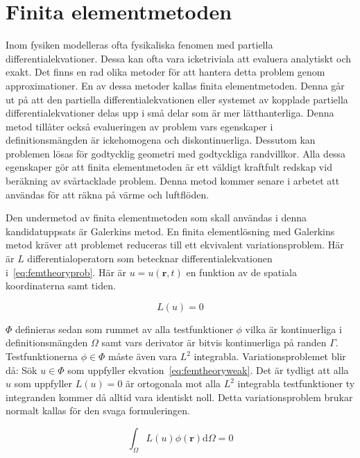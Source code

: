 \section{Finita elementmetoden}

Inom fysiken modelleras ofta fysikaliska fenomen med partiella differentialekvationer.
Dessa kan ofta vara icketriviala att evaluera analytiskt och exakt. Det finns en
rad olika metoder för att hantera detta problem genom approximationer. En av
dessa metoder kallas finita elementmetoden. Denna går ut på att den
partiella differentialekvationen eller systemet av kopplade partiella
differentialekvationer delas upp i små delar som är mer lätthanterliga.
Denna metod tillåter också evalueringen av problem vars egenskaper i
definitionsmängden är ickehomogena och diskontinuerliga. Dessutom kan
problemen lösas för godtycklig geometri med godtyckliga randvillkor. Alla
dessa egenskaper gör att finita elementmetoden är ett väldigt kraftfult redskap
vid beräkning av svårtacklade problem. Denna metod kommer senare i arbetet
att användas för att räkna på värme och luftflöden.

Den undermetod av finita elementmetoden som skall användas i denna
kandidatuppsats är Galerkins metod.
En finita elementlösning med Galerkins metod kräver att problemet reduceras till
ett ekvivalent variationsproblem.
Här är $L$ differentialoperatorn
som betecknar differentialekvationen i~\eqref{eq:femtheoryprob}.
Här är $u = u(\mathbf{r},t)$ en funktion av de spatiala koordinaterna samt tiden.

\begin{equation}
\label{eq:femtheoryprob}
L(u) = 0
\end{equation}

\noindent
$\Phi$ definieras sedan som rummet av alla testfunktioner $\phi$ vilka
 är kontinuerliga i
definitionsmängden $\Omega$ samt vars derivator är bitvis kontinuerliga på randen
$\Gamma$. Testfunktionerna $\phi \in \Phi$ måste även vara $L^2$ integrabla.
Variationsproblemet blir då: Sök $u\in\Phi$
som uppfyller ekvation~\eqref{eq:femtheoryweak}. Det är tydligt
att alla $u$ som uppfyller $L(u) = 0$ är ortogonala mot alla
$L^2$ integrabla testfunktioner ty integranden kommer då alltid vara identiskt noll.
Detta variationsproblem brukar normalt kallas för den svaga formuleringen.

\begin{equation}
\label{eq:femtheoryweak}
\int_\Omega L(u)\phi(\mathbf{r}) \mathrm{d}\Omega = 0
\end{equation}

